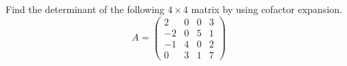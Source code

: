\documentclass{ximera}
\author{Parisa Fatheddin}
\begin{document}
\begin{exercise}


Find the determinant of the following $4\times4$ matrix by using cofactor expansion. 
\[
A = \begin{pmatrix}
2 & 0 & 0 & 3\\
-2 & 0 & 5 & 1\\
-1 & 4 & 0 & 2\\
0 & 3 & 1 & 7
\end{pmatrix}
\]

















\end{exercise}
\end{document}
